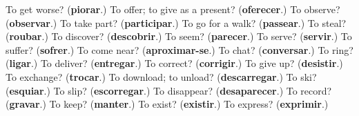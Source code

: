 \begin{tcolorbox}[breakable,colback=teal!4,colframe=teal!35!black,title={Before you move on}]
To get worse? (\textbf{piorar}.) To offer; to give as a present? (\textbf{oferecer}.) To observe? (\textbf{observar}.) To take part? (\textbf{participar}.) To go for a walk? (\textbf{passear}.) To steal? (\textbf{roubar}.) To discover? (\textbf{descobrir}.) To seem? (\textbf{parecer}.) To serve? (\textbf{servir}.) To suffer? (\textbf{sofrer}.) To come near? (\textbf{aproximar-se}.) To chat? (\textbf{conversar}.) To ring? (\textbf{ligar}.) To deliver? (\textbf{entregar}.) To correct? (\textbf{corrigir}.) To give up? (\textbf{desistir}.) To exchange? (\textbf{trocar}.) To download; to unload? (\textbf{descarregar}.) To ski? (\textbf{esquiar}.) To slip? (\textbf{escorregar}.) To disappear? (\textbf{desaparecer}.) To record? (\textbf{gravar}.) To keep? (\textbf{manter}.) To exist? (\textbf{existir}.) To express? (\textbf{exprimir}.)
\end{tcolorbox}
